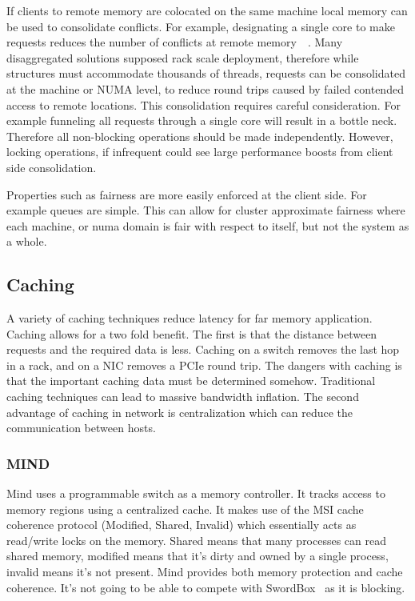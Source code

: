 If clients to remote memory are colocated on the same machine local memory can
be used to consolidate conflicts. For example, designating a single core to make
requests reduces the number of conflicts at remote
memory~\cite{flat-combine}~\cite{sherman}. Many disaggregated solutions supposed
rack scale deployment, therefore while structures must accommodate thousands of
threads, requests can be consolidated at the machine or NUMA level, to reduce
round trips caused by failed contended access to remote locations. This
consolidation requires careful consideration. For example funneling all requests
through a single core will result in a bottle neck. Therefore all non-blocking
operations should be made independently. However, locking operations, if
infrequent could see large performance boosts from client side consolidation.

Properties such as fairness are more easily enforced at the client side. For
example queues are simple. This can allow for cluster approximate fairness where
each machine, or numa domain is fair with respect to itself, but not the system
as a whole.

\subsection{Caching} A variety of caching techniques reduce latency for far memory
application. Caching allows for a two fold benefit. The first is that the
distance between requests and the required data is less. Caching on a switch
removes the last hop in a rack, and on a NIC removes a PCIe round trip. The
dangers with caching is that the important caching data must be determined
somehow. Traditional caching techniques can lead to massive bandwidth inflation.
The second advantage of caching in network is centralization which can reduce
the communication between hosts.


\subsubsection{MIND~\cite{mind}}

Mind uses a programmable switch as a memory controller. It tracks access to
memory regions using a centralized cache. It makes use of the MSI cache
coherence protocol (Modified, Shared, Invalid) which essentially acts as
read/write locks on the memory. Shared means that many processes can read shared
memory, modified means that it's dirty and owned by a single process, invalid
means it's not present. Mind provides both memory protection and cache
coherence. It's not going to be able to compete with
SwordBox~\cite{Grant2021InContRes} as it is blocking.

